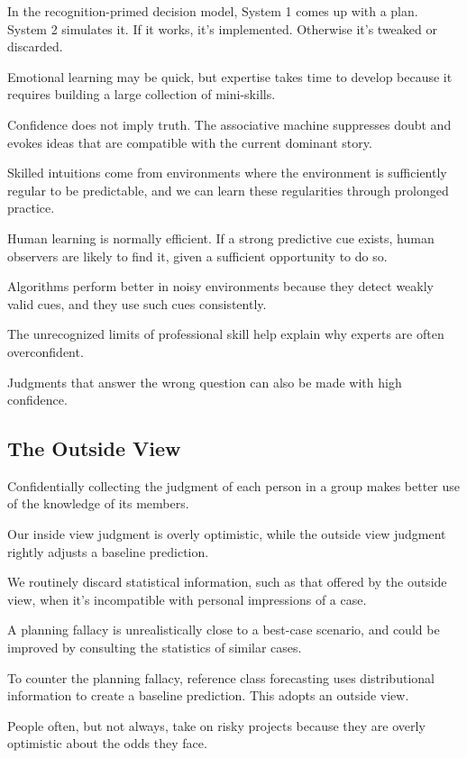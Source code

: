 \bit
\item In the recognition-primed decision model, System 1 comes up with a plan. System 2 simulates it. If it works,
it's implemented. Otherwise it's tweaked or discarded.
\item Emotional learning may be quick, but expertise takes time to develop because it requires building a large
collection of mini-skills.
\item Confidence does not imply truth. The associative machine suppresses doubt and evokes ideas that are compatible
with the current dominant story.
\item Skilled intuitions come from environments where the environment is sufficiently regular to be predictable, and
we can learn these regularities through prolonged practice.
\item Human learning is normally efficient. If a strong predictive cue exists, human observers are likely to find it,
given a sufficient opportunity to do so.
\item Algorithms perform better in noisy environments because they detect weakly valid cues, and they use such cues
consistently.
\item The unrecognized limits of professional skill help explain why experts are often overconfident.
\item Judgments that answer the wrong question can also be made with high confidence.
\eit

\subsection*{The Outside View}

\bit\item Confidentially collecting the judgment of each person in a group makes better use of the knowledge of its members.
\item Our inside view judgment is overly optimistic, while the outside view judgment rightly adjusts a baseline
prediction.
\item We routinely discard statistical information, such as that offered by the outside view, when it's incompatible
with personal impressions of a case.
\item A planning fallacy is unrealistically close to a best-case scenario, and could be improved by consulting the
statistics of similar cases.
\item To counter the planning fallacy, reference class forecasting uses distributional information to create a
baseline prediction. This adopts an outside view.
\item People often, but not always, take on risky projects because they are overly optimistic about the odds they
face.
\eit

